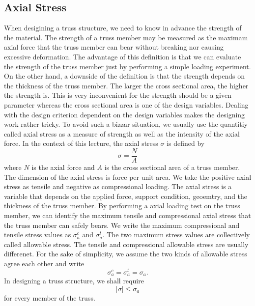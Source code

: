 \documentclass[10pt,a4j]{article}
\begin{document}
\subsection{Axial Stress}
When desigining a truss structure, we need to know in advance the strength of 
the material. The strength of a truss member may be measured as the maximam axial 
force that the truss member can bear without breaking nor causing excessive deformation. 
The advantage of this definition is that we can evaluate the strength of the truss 
member just by performing a simple loading experiment.
On the other hand, a downside of the definition is that the strength depends on 
the thickness of the truss member. The larger the cross sectional area, the 
higher the strength is. This is very inconvenient for the strength should be a 
given parameter whereas the cross sectional area is one of the design 
variables. Dealing with the design criterion dependent on the design variables 
 makes the designing work rather tricky. 
 To avoid such a bizzar situation, we usually use the quantitiy called axial 
 stress as a measure of strength as well as the intensity of the axial force.
In the context of this lecture, the axial stress $\sigma$ is defined by
\begin{equation}
	\sigma=\frac{N}{A}
	\label{eqn:def_sigma}
\end{equation}
where $N$ is the axial force and $A$ is the cross sectional area of a truss member. 
The dimension of the axial stress is force per unit area. 
We take the positive axial stress as tensile and negative as compressional loading. 
The axial stress is a variable that depends on the applied force, 
support condition, geoemtry, and the thickness of the truss member. 
By performing a axial loading test on the truss member, 
we can identify the maximum tensile and compressional axial stress 
that the truss member can safely bears. 
We write the maximum compressional and tensile stress values as 
$\sigma_{a}^c$ and $\sigma_{a}^t$. 
The two maximum stress values are collectively called allowable stress.
The tensile and compressional allowable stress are usually differenet. 
For the sake of simplicity, we assume the two kinds of allowable stress agree 
each other and write
\begin{equation}
	\sigma_a^c=\sigma_a^t=\sigma_a.
	\label{eqn:sig_a}
\end{equation}
In designing a truss structure, we shall require 
\begin{equation}
	\left| \sigma \right| \leq \sigma_a
	\label{eqn:sig_a_cond}
\end{equation}
for every member of the truss. 
\end{document}
